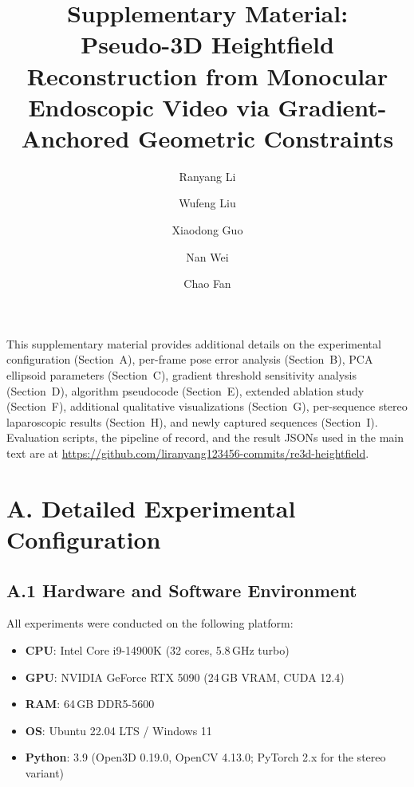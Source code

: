 \documentclass[review]{elsarticle}
\begin{document}
\begin{frontmatter}

\title{Supplementary Material:\\
Pseudo-3D Heightfield Reconstruction from Monocular Endoscopic Video via Gradient-Anchored Geometric Constraints}

\author[1]{Ranyang Li}
\author[1]{Wufeng Liu}
\author[1]{Xiaodong Guo}
\author[2]{Nan Wei}
\author[1]{Chao Fan}
\address[1]{School of Artificial Intelligence and Big Data, Henan University of Technology, Zhengzhou 450001, China}
\address[2]{Henan Provincial People's Hospital, Zhengzhou University, Zhengzhou 450003, China}

\end{frontmatter}

This supplementary material provides additional details on the experimental configuration (Section~A), per-frame pose error analysis (Section~B), PCA ellipsoid parameters (Section~C), gradient threshold sensitivity analysis (Section~D), algorithm pseudocode (Section~E), extended ablation study (Section~F), additional qualitative visualizations (Section~G), per-sequence stereo laparoscopic results (Section~H), and newly captured sequences (Section~I). Evaluation scripts, the pipeline of record, and the result JSONs used in the main text are at \url{https://github.com/liranyang123456-commits/re3d-heightfield}.

\section*{A. Detailed Experimental Configuration}

\subsection*{A.1 Hardware and Software Environment}

All experiments were conducted on the following platform:
\begin{itemize}[noitemsep]
    \item \textbf{CPU}: Intel Core i9-14900K (32 cores, 5.8\,GHz turbo)
    \item \textbf{GPU}: NVIDIA GeForce RTX 5090 (24\,GB VRAM, CUDA 12.4)
    \item \textbf{RAM}: 64\,GB DDR5-5600
    \item \textbf{OS}: Ubuntu 22.04 LTS / Windows 11
    \item \textbf{Python}: 3.9 (Open3D 0.19.0, OpenCV 4.13.0; PyTorch 2.x for the stereo variant)
\end{itemize}
\end{document}
